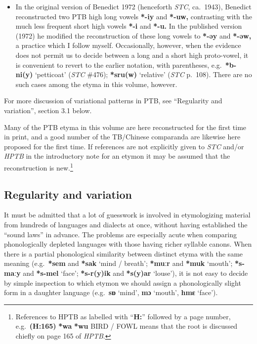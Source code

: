 \begin{itemize}
\item In the original version of Benedict 1972 (henceforth \textit{STC}, ca.~1943), Benedict reconstructed two PTB high
long vowels \textbf{*-iy} and \textbf{*-uw,} contrasting with the much less frequent short high
vowels \textbf{*-i} and \textbf{*-u.}  In the published version (1972) he modified the
reconstruction of these long vowels to \textbf{*-əy} and \textbf{*-əw,} a practice which I follow
myself.  Occasionally, however, when the evidence does not permit us to decide
between a long and a short high proto-vowel, it is convenient to revert to the
earlier notation, with parentheses, e.g.\ \textbf{*b-ni(y)} ‘petticoat’ (\textit{STC} \#476);
\textbf{*sru(w)} ‘relative’ (\textit{STC} p.~108).  There are no such cases among the etyma in
this volume, however.
\end{itemize}


For more discussion of variational patterns in PTB, see “Regularity and
variation”, section 3.1 below.


Many of the PTB etyma in this volume are here reconstructed for the first
time in print, and a good number of the TB/Chinese comparanda are likewise here
proposed for the first time.  If references are not explicitly given to \textit{STC}
and/or \textit{HPTB} in the introductory note for an etymon it may be assumed that the
reconstruction is new.\footnote{References to HPTB as labelled with “\textbf{H:}” followed by a page number, e.g.\ \textbf{(H:165)} \textbf{*wa}  \textbf{*wu} BIRD / FOWL means that the root is discussed chiefly on page 165 of \textit{HPTB}.}

\subsection{Regularity and variation}


It must be admitted that a lot of guesswork is involved in etymologizing
material from hundreds of languages and dialects at once, without having
established the “sound laws” in advance. The problems are especially acute when
comparing phonologically depleted languages with those having richer syllable
canons. When there is a partial phonological similarity between distinct etyma
with the same meaning (e.g.\ \textbf{*sem} and \textbf{*sak}  ‘mind / breath’;
\textbf{*muːr} and \textbf{*muk}
‘mouth’; \textbf{*s-maːy} and \textbf{*s-mel} ‘face’;
\textbf{*s-r(y)ik} and \textbf{*s(y)ar} ‘louse’), it is not
easy to decide by simple inspection to which etymon we should assign a
phonologically slight form in a daughter language (e.g.\ \textbf{sɒ} ‘mind’,
\textbf{mɔ} ‘mouth’,
\textbf{hmɛ} ‘face’).


